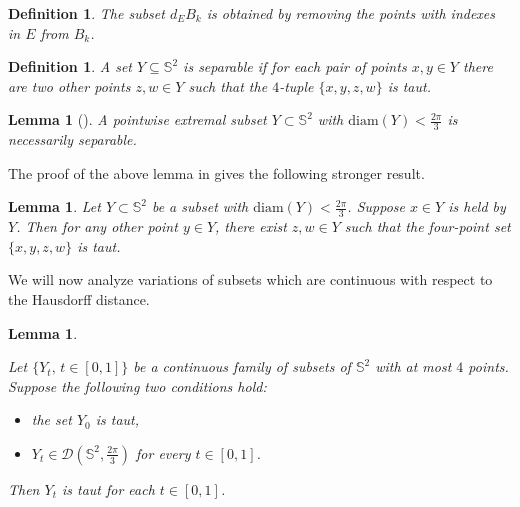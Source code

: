 \documentclass[12pt]{amsart}
\theoremstyle{plain}
\newtheorem{lemma}[theorem]{Lemma}
\newtheorem{definition}[theorem]{Definition}
\newcommand{\Sp}{\mathbb{S}}
\newcommand{\diam}{\mathrm{diam}}
\numberwithin{equation}{section}
\begin{document}
\begin{definition}
The subset $d_EB_k$ is obtained by removing the points with indexes in
$E$ from $B_k$.
\end{definition}

\begin{definition}
A set $Y\subseteq\Sp^2$ is \emph{separable} if for each pair of points
$x,y\in Y$ there are two other points $z,w\in Y$ such that the
$4$-tuple $\{x,y,z,w\}$ is taut.
\end{definition}



\begin{lemma}[{\cite[Lemma~4.1]{katz1989diameter}}]\label{lem:pointwise_extremal_is_taut}
A pointwise extremal subset $Y\subset \Sp^2$ with
$\diam(Y)<\frac{2\pi}{3}$ is necessarily separable.
\end{lemma}

The proof of the above lemma in \cite{katz1989diameter} gives the
following stronger result.

\begin{lemma}
\label{rmk:hela_lead_to_taut}
Let $Y\subset \Sp^2$ be a subset with $\diam(Y) < \frac{2\pi}{3}$.
Suppose $x\in Y$ is held by $Y$.  Then for any other point $y\in Y$,
there exist $z, w\in Y$ such that the four-point set $\{x, y, z, w\}$
is taut.
\end{lemma}


We will now analyze variations of subsets which are continuous with
respect to the Hausdorff distance.

\begin{lemma}\label{lem:non-coalesce}
	
	
	Let $\{Y_t,\, t\in [0, 1]\}$ be a continuous family of subsets
        of $\Sp^2$ with at most $4$ points. Suppose the following two
        conditions hold:
	\begin{itemize}
	\item the set $Y_0$ is taut,
	\item $Y_t\in \mathcal D(\Sp^2, \frac{2\pi}{3})$ for every
	  $t\in[0,1]$.
	\end{itemize}
	Then $Y_t$ is taut for each $t\in [0,1]$.
	\end{lemma}
	
\end{document}
